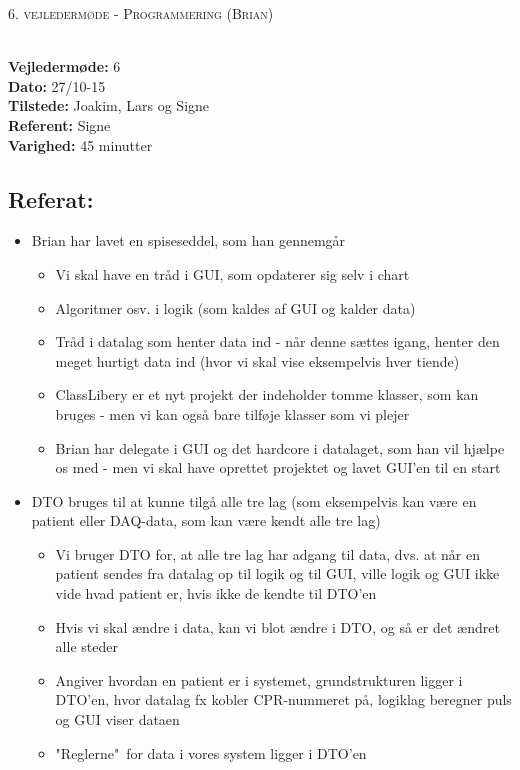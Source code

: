 \documentclass[a4paper,11pt,oneside]{memoir}
\begin{document}
\begin{center} 
\huge{\textsc{6. vejledermøde - Programmering (Brian)}}
\end{center}

\textbf{ }
\\
\textbf{Vejledermøde:} 6
\\
\textbf{Dato:} 27/10-15
\\
\textbf{Tilstede:} Joakim, Lars og Signe
\\
\textbf{Referent:} Signe
\\
\textbf{Varighed:} 45 minutter
\\

\subsection{Referat:}
\begin{itemize}
\item Brian har lavet en spiseseddel, som han gennemgår
\begin{itemize}
\item Vi skal have en tråd i GUI, som opdaterer sig selv i chart 
\item Algoritmer osv. i logik (som kaldes af GUI og kalder data)
\item Tråd i datalag som henter data ind - når denne sættes igang, henter den meget hurtigt data ind (hvor vi skal vise eksempelvis hver tiende)
\item ClassLibery er et nyt projekt der indeholder tomme klasser, som kan bruges - men vi kan også bare tilføje klasser som vi plejer
\item Brian har delegate i GUI og det hardcore i datalaget, som han vil hjælpe os med - men vi skal have oprettet projektet og lavet GUI'en til en start
\end{itemize}
\item DTO bruges til at kunne tilgå alle tre lag (som eksempelvis kan være en patient eller DAQ-data, som kan være kendt alle tre lag)
\begin{itemize}
\item Vi bruger DTO for, at alle tre lag har adgang til data, dvs. at når en patient sendes fra datalag op til logik og til GUI, ville logik og GUI ikke vide hvad patient er, hvis ikke de kendte til DTO'en
\item Hvis vi skal ændre i data, kan vi blot ændre i DTO, og så er det ændret alle steder 
\item Angiver hvordan en patient er i systemet, grundstrukturen ligger i DTO'en, hvor datalag fx kobler CPR-nummeret på, logiklag beregner puls og GUI viser dataen
\item "Reglerne"\ for data i vores system ligger i DTO'en
\end{itemize}
\end{itemize}
\end{document}
